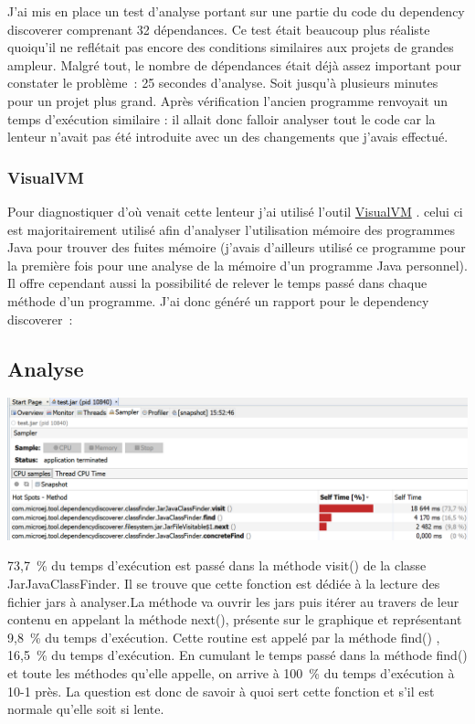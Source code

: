 \documentclass[french,a4paper,12pt]{report}
\begin{document}
J’ai mis en place un test d’analyse portant sur une partie du code du dependency discoverer comprenant 32 dépendances. Ce test était beaucoup plus réaliste quoiqu'il ne reflétait pas encore des conditions similaires aux projets de grandes ampleur. Malgré tout, le nombre de dépendances était déjà assez important pour constater le problème : 25 secondes d’analyse. Soit jusqu’à plusieurs minutes pour un projet plus grand. Après vérification l’ancien programme renvoyait un temps d’exécution similaire : il allait donc falloir analyser tout le code car la lenteur n'avait pas été introduite avec un des changements que j'avais effectué. 

\subsubsection{VisualVM}

Pour diagnostiquer d’où venait cette lenteur j’ai utilisé l’outil \href{https://visualvm.github.io/}{VisualVM} . celui ci est majoritairement utilisé afin d’analyser l’utilisation mémoire des programmes Java pour trouver des fuites mémoire (j’avais d’ailleurs utilisé ce programme pour la première fois pour une analyse de la mémoire d’un programme Java personnel). Il offre cependant aussi la possibilité de relever le temps passé dans chaque méthode d’un programme. J’ai donc généré un rapport pour le dependency discoverer :


\subsection{Analyse}

\begin{center}
\includegraphics[width=\textwidth]{./ressources/images/timeRepartitionByMethodssheer.png}
\end{center}

73,7 \% du temps d’exécution est passé dans la méthode visit() de la classe JarJavaClassFinder. Il se trouve que cette fonction est dédiée à la lecture des fichier jars à analyser.La méthode va ouvrir les jars puis itérer au travers de leur contenu en appelant la méthode next(), présente sur le graphique et représentant 9,8 \% du temps d’exécution. Cette routine est appelé par la méthode find() , 16,5 \% du temps d’exécution. En cumulant le temps passé dans la méthode find() et toute les méthodes qu'elle appelle, on arrive à 100 \% du temps d’exécution à 10-1 près. La question est donc de savoir à quoi sert cette fonction et s'il est normale qu’elle soit si lente.
\end{document}

